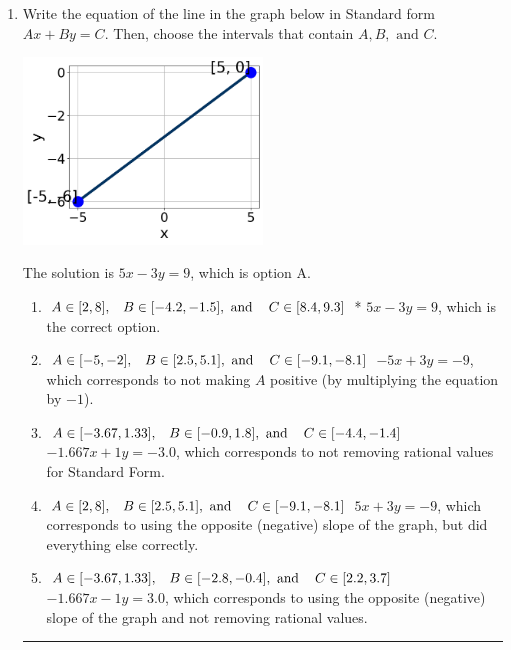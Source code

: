 \documentclass{extbook}[14pt]
\newcommand{\litem}[1]{\item #1

\rule{\textwidth}{0.4pt}}
\begin{document}
\begin{enumerate}\litem{
Write the equation of the line in the graph below in Standard form $Ax+By=C$. Then, choose the intervals that contain $A, B, \text{ and } C$.

\begin{center}
    \includegraphics[width=0.5\textwidth]{../Figures/linearGraphToStandardC.png}
\end{center}

The solution is \( 5x - 3y = 9 \), which is option A.\begin{enumerate}[label=\Alph*.]
\item \( A \in [2, 8], \hspace{3mm} B \in [-4.2, -1.5], \text{ and } \hspace{3mm} C \in [8.4, 9.3] \)
* $5x - 3y = 9$, which is the correct option.
\item \( A \in [-5, -2], \hspace{3mm} B \in [2.5, 5.1], \text{ and } \hspace{3mm} C \in [-9.1, -8.1] \)
 $-5x + 3y = -9$, which corresponds to not making $A$ positive (by multiplying the equation by $-1$).
\item \( A \in [-3.67, 1.33], \hspace{3mm} B \in [-0.9, 1.8], \text{ and } \hspace{3mm} C \in [-4.4, -1.4] \)
 $-1.667x + 1y = -3.0$, which corresponds to not removing rational values for Standard Form.
\item \( A \in [2, 8], \hspace{3mm} B \in [2.5, 5.1], \text{ and } \hspace{3mm} C \in [-9.1, -8.1] \)
 $5x + 3y = -9$, which corresponds to using the opposite (negative) slope of the graph, but did everything else correctly.
\item \( A \in [-3.67, 1.33], \hspace{3mm} B \in [-2.8, -0.4], \text{ and } \hspace{3mm} C \in [2.2, 3.7] \)
 $-1.667x - 1y = 3.0$, which corresponds to using the opposite (negative) slope of the graph and not removing rational values.
\end{enumerate}

}
\end{enumerate}
\end{document}

